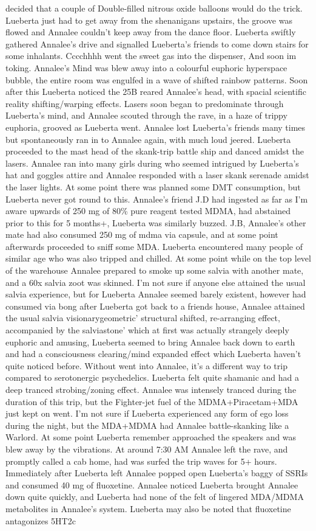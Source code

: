 \documentclass[12pt]{book}
\begin{document}
decided that a couple of Double-filled nitrous oxide balloons would do the trick. Lueberta just had to get away from the shenanigans upstairs, the groove was flowed and Annalee couldn't keep away from the dance floor. Lueberta swiftly gathered Annalee's drive and signalled Lueberta's friends to come down stairs for some inhalants. Cccchhhh went the sweet gas into the dispenser, And soon im toking. Annalee's Mind was blew away into a colourful euphoric hyperspace bubble, the entire room was engulfed in a wave of shifted rainbow patterns. Soon after this Lueberta noticed the 25B reared Annalee's head, with spacial scientific reality shifting/warping effects. Lasers soon began to predominate through Lueberta's mind, and Annalee scouted through the rave, in a haze of trippy euphoria, grooved as Lueberta went. Annalee lost Lueberta's friends many times but spontaneously ran in to Annalee again, with much loud jeered. Lueberta proceeded to the mast head of the skank-trip battle ship and danced amidst the lasers. Annalee ran into many girls during who seemed intrigued by Lueberta's hat and goggles attire and Annalee responded with a laser skank serenade amidst the laser lights. At some point there was planned some DMT consumption, but Lueberta never got round to this. Annalee's friend J.D had ingested as far as I'm aware upwards of 250 mg of 80\% pure reagent tested MDMA, had abstained prior to this for 5 months+, Lueberta was similarly buzzed. J.B, Annalee's other mate had also consumed 250 mg of mdma via capsule, and at some point afterwards proceeded to sniff some MDA. Lueberta encountered many people of similar age who was also tripped and chilled. At some point while on the top level of the warehouse Annalee prepared to smoke up some salvia with another mate, and a 60x salvia zoot was skinned. I'm not sure if anyone else attained the usual salvia experience, but for Lueberta Annalee seemed barely existent, however had consumed via bong after Lueberta got back to a friends house, Annalee attained the usual salvia visionarygeometric' structural shifted, re-arranging effect, accompanied by the salviastone' which at first was actually strangely deeply euphoric and amusing, Lueberta seemed to bring Annalee back down to earth and had a consciousness clearing/mind expanded effect which Lueberta haven't quite noticed before. Without went into Annalee, it's a different way to trip compared to serotonergic psychedelics. Lueberta felt quite shamanic and had a deep tranced strobing/zoning effect. Annalee was intensely tranced during the duration of this trip, but the Fighter-jet fuel of the MDMA+Piracetam+MDA just kept on went. I'm not sure if Lueberta experienced any form of ego loss during the night, but the MDA+MDMA had Annalee battle-skanking like a Warlord. At some point Lueberta remember approached the speakers and was blew away by the vibrations. At around 7:30 AM Annalee left the rave, and promptly called a cab home, had was surfed the trip waves for 5+ hours. Immediately after Lueberta left Annalee popped open Lueberta's baggy of SSRIs and consumed 40 mg of fluoxetine. Annalee noticed Lueberta brought Annalee down quite quickly, and Lueberta had none of the felt of lingered MDA/MDMA metabolites in Annalee's system. Lueberta may also be noted that fluoxetine antagonizes 5HT2c 
\end{document}
